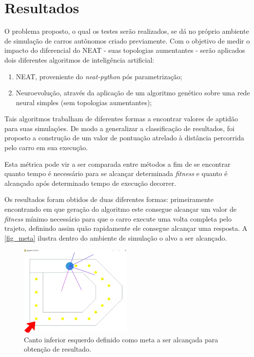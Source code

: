 \chapter{Resultados}

O problema proposto, o qual os testes serão realizados, se dá no próprio
ambiente de simulação de carros autônomos criado previamente. Com o objetivo de
medir o impacto do diferencial do NEAT - suas topologias aumentantes - serão
aplicados dois diferentes algoritmos de inteligência artificial:

\begin{enumerate}
	\item NEAT, proveniente do \textit{neat-python} pós parametrização; 
	\item Neuroevolução, através da aplicação de um algoritmo genético sobre uma rede neural simples (sem topologias aumentantes);
\end{enumerate}

Tais algoritmos trabalham de diferentes formas a encontrar valores de aptidão
para suas simulações. De modo a generalizar a classificação de resultados, foi
proposto a construção de um valor de pontua{\c c}{\~a}o atrelado à distância percorrida pelo
carro em sua execução.

Esta métrica pode vir a ser comparada entre métodos a fim de se encontrar
quanto tempo é necessário para se alcançar determinada \textit{fitness} e quanto é
alcançado após determinado tempo de execução decorrer.

Os resultados foram obtidos de duas diferentes formas: primeiramente
encontrando em que geração do algoritmo este consegue alcançar um valor de
\textit{fitness} mínimo necessário para que o carro execute uma volta completa pelo
trajeto, definindo assim quão rapidamente ele consegue alcançar uma resposta. A
\autoref{fig_meta} ilustra dentro do ambiente de simulação o alvo a ser alcançado.

\begin{figure}[htb]
        \centering
        \caption{\label{fig_meta}Canto inferior esquerdo definido como meta a ser alcançada para obtenção de resultado.}
        \includegraphics[width=0.5\textwidth]{images/meta.png}
\end{figure}

